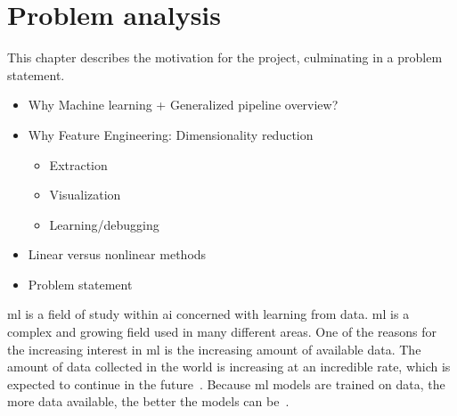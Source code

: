 \chapter{Problem analysis}\label{cha:problem-analysis}
This chapter describes the motivation for the project, culminating in a problem statement.

\begin{itemize}
    \item Why Machine learning + Generalized pipeline overview?
    \item Why Feature Engineering: Dimensionality reduction
          \begin{itemize}
              \item Extraction
              \item Visualization
              \item Learning/debugging
          \end{itemize}
    \item Linear versus nonlinear methods
    \item Problem statement
\end{itemize}

\gls{ml} is a field of study within \gls{ai} concerned with learning from data. \gls{ml} is a complex and growing field used in many different areas. One of the reasons for the increasing interest in \gls{ml} is the increasing amount of available data. The amount of data collected in the world is increasing at an incredible rate, which is expected to continue in the future~\cite{data-never-sleeps}. Because \gls{ml} models are trained on data, the more data available, the better the models can be~\cite{Unreasonable-effectiveness-of-data-Norvig}.

